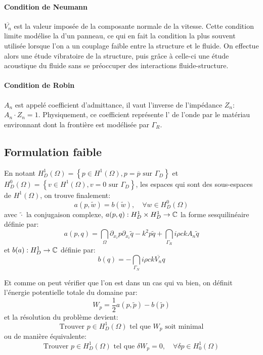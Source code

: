 \paragraph{Condition de Neumann}
$\overline{V_n}$ est la valeur imposée de la composante normale de la vitesse.
Cette condition limite modélise la  d'un panneau, ce qui en fait la condition la
plus souvent utilisée lorsque l'on a un couplage faible entre la structure et le fluide.
On effectue alors une étude vibratoire de la structure, puis grâce à celle-ci une
étude acoustique du fluide sans se préoccuper des interactions fluide-structure.

\medskip
\paragraph{Condition de Robin}
$A_n$ est appelé coefficient d'admittance, il vaut l'inverse de l'impédance $Z_n$:
$A_n\cdot Z_n=1$.
Physiquement, ce coefficient représente l' de l'onde par le matériau environnant
dont la frontière est modélisée par $\Gamma_R$.

\medskip
\subsection{Formulation faible}
En notant $H^1_D(\Omega)=\left\{p\in H^1(\Omega), p=\overline{p} \text{ sur } \Gamma_D\right\}$ et
$H^0_D(\Omega)=\left\{v\in H^1(\Omega), v=0 \text{ sur } \Gamma_D\right\}$, les espaces qui sont
des sous-espaces de $H^1(\Omega)$, on trouve finalement:
\begin{equation}a(p,\tilde{w})=b(\tilde{w}), \quad \forall w\in H^0_D(\Omega)\end{equation}
avec $\tilde{\cdot}$ la conjugaison complexe, $a(p,q): H^1_D\times H^1_D \rightarrow \mathbb C$ la forme
sesquilinéaire définie par:
\begin{equation}a(p,q)=\dint_\Omega \partial_{x_i}p\partial_{x_i}\tilde{q}-k^2p\tilde{q} +
\dint_{\Gamma_R} i\rho ckA_n\tilde{q}
\end{equation}
et $b(a): H^1_D\rightarrow\mathbb C$ définie par:
\begin{equation}b(q)=-\dint_{\Gamma_N} i\rho c k\overline{V_n} q\end{equation}

\medskip
Et comme on peut vérifier que l'on est dans un cas qui va bien, on définit l'énergie
potentielle totale du domaine par:
\begin{equation}W_p=\frac12 a(p,\tilde{p})-b(\tilde{p})\end{equation}
et la résolution du problème devient:
\begin{equation}
\text{Trouver } p\in H^1_D(\Omega) \text{ tel que } W_p \text{ soit minimal}
\end{equation}
ou de manière équivalente:
\begin{equation}
\text{Trouver } p\in H^1_D(\Omega) \text{ tel que } \delta W_p=0,\quad \forall\delta p\in H^1_0(\Omega)
\end{equation} 